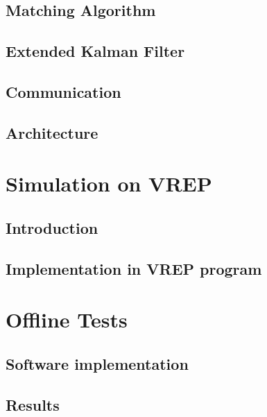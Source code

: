 \documentclass[11pt, oneside]{book} %
\begin{document}
\section{Matching Algorithm}


\section{Extended Kalman Filter}


\newpage
\section{Communication}


\section{Architecture} \label{sec:SoftArch}



\chapter{Simulation on VREP}
\section{Introduction}


\section{Implementation in VREP program}


\chapter{Offline Tests}
\section{Software implementation}


\section{Results}

\end{document}
